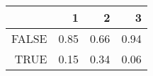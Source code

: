 \begin{table}[ht]
\centering
\begin{tabular}{rrrr}
  \hline
 & 1 & 2 & 3 \\ 
  \hline
FALSE & 0.85 & 0.66 & 0.94 \\ 
  TRUE & 0.15 & 0.34 & 0.06 \\ 
   \hline
\end{tabular}
\end{table}
